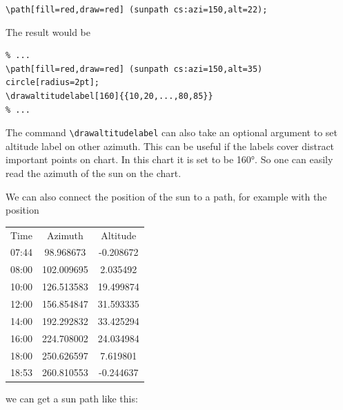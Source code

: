 \verb|\path[fill=red,draw=red] (sunpath cs:azi=150,alt=22);|

The result would be

\begin{verbatim}
% ...
\path[fill=red,draw=red] (sunpath cs:azi=150,alt=35) circle[radius=2pt];
\drawaltitudelabel[160]{{10,20,...,80,85}}
% ...
\end{verbatim}


The command \verb:\drawaltitudelabel: can also take an optional argument to set altitude label on other azimuth.
This can be useful if the labels cover distract important points on chart.
In this chart it is set to be 160°. So one can easily read the azimuth of the sun on the chart.

We can also connect the position of the sun to a path, for example with the position

{\ttfamily
\begin{tabular}{c  c  c}
Time  & Azimuth    & Altitude  \\
07:44 &  98.968673 & -0.208672 \\
08:00 & 102.009695 &  2.035492 \\
10:00 & 126.513583 & 19.499874 \\
12:00 & 156.854847 & 31.593335 \\
14:00 & 192.292832 & 33.425294 \\
16:00 & 224.708002 & 24.034984 \\
18:00 & 250.626597 &  7.619801 \\
18:53 & 260.810553 & -0.244637 \\
\end{tabular}
}

we can get a sun path like this:

